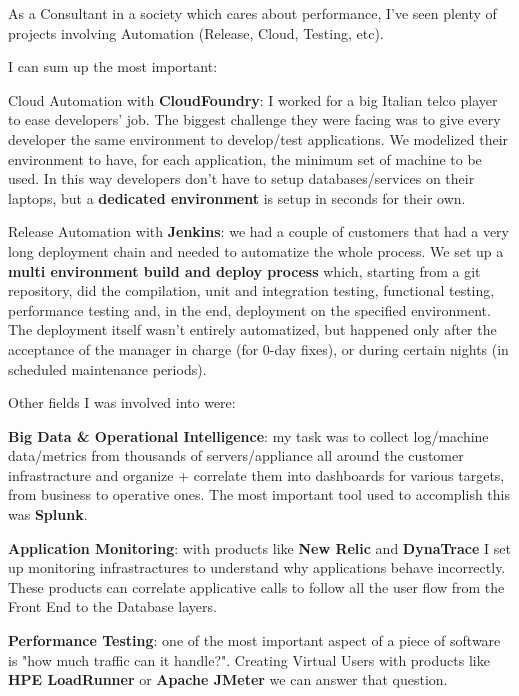 \begin{minipage}[t]{0.66\textwidth} %

\vspace{\topsep} %

As a Consultant in a society which cares about performance, I've seen plenty of projects involving Automation (Release, Cloud, Testing, etc).

I can sum up the most important:

\begin{tightitemize}
\item Cloud Automation with \textbf{CloudFoundry}: I worked for a big Italian telco player to ease developers' job. The biggest challenge they were facing was to give every developer the same environment to develop/test applications. We modelized their environment to have, for each application, the minimum set of machine to be used. In this way developers don't have to setup databases/services on their laptops, but a \textbf{dedicated environment} is setup in seconds for their own.
\item Release Automation with \textbf{Jenkins}: we had a couple of customers that had a very long deployment chain and needed to automatize the whole process. We set up a \textbf{multi environment build and deploy process} which, starting from a git repository, did the compilation, unit and integration testing, functional testing, performance testing and, in the end, deployment on the specified environment. The deployment itself wasn't entirely automatized, but happened only after the acceptance of the manager in charge (for 0-day fixes), or during certain nights (in scheduled maintenance periods). 
\end{tightitemize}

Other fields I was involved into were:

\begin{tightitemize}
\item \textbf{Big Data \& Operational Intelligence}: my task was to collect log/machine data/metrics from thousands of servers/appliance all around the customer infrastracture and organize + correlate them into dashboards for various targets, from business to operative ones. The most important tool used to accomplish this was \textbf{Splunk}.
\item \textbf{Application Monitoring}: with products like \textbf{New Relic} and \textbf{DynaTrace} I set up monitoring infrastractures to understand why applications behave incorrectly. These products can correlate applicative calls to follow all the user flow from the Front End to the Database layers.
\item \textbf{Performance Testing}: one of the most important aspect of a piece of software is "how much traffic can it handle?". Creating Virtual Users with products like \textbf{HPE LoadRunner} or \textbf{Apache JMeter} we can answer that question.
\end{tightitemize}

\end{minipage} %

